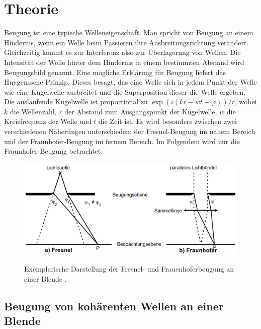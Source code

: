 
\section{Theorie}
\label{sec:Theorie}

Beugung ist eine typische Welleneigenschaft. Man spricht von Beugung an einem Hindernis, wenn ein Welle beim Passieren ihre Ausbreitungsrichtung verändert. Gleichzeitig kommt es zur Interferenz also zur Überlagerung von Wellen. Die Intensität der Welle hinter dem Hindernis in einem bestimmten Abstand wird Beugungsbild genannt. Eine mögliche Erklärung für Beugung liefert das Huygenssche Prinzip. Dieses besagt, das eine Welle sich in jedem Punkt der Welle wie eine Kugelwelle ausbreitet und die Superposition dieser die Welle ergeben. Die auslaufende Kugelwelle ist proportional zu $\exp(i (k r -w t+\varphi))/r$, wobei $k$ die Wellenzahl, $r$ der Abstand zum Ausgangspunkt der Kugelwelle, $w$ die Kreisfrequenz der Welle und $t$ die Zeit ist. Es wird besonders zwischen zwei verschiedenen Näherungen unterschieden: der Fresnel-Beugung im nahem Bereich und der Fraunhofer-Beugung im fernem Bereich. Im Folgendem wird nur die Fraunhofer-Beugung betrachtet.
\begin{figure}
	\centering
	\caption{Exemplarische Darstellung der Fresnel- und Frauenhoferbeugung an einer Blende \cite{V406}.}
	\includegraphics[width=\linewidth-150pt,height=\textheight-150pt,keepaspectratio]{content/images/FresnelFrauenhoferBeugung.png}
	\label{fig:FFB}
\end{figure}

\subsection{Beugung von kohärenten Wellen an einer Blende}

